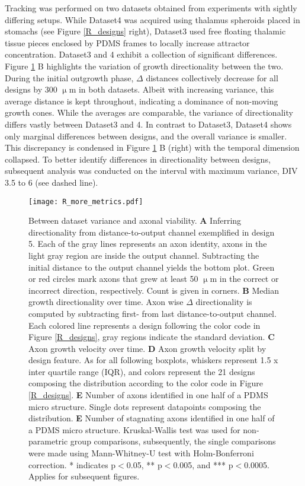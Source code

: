 Tracking was performed on two datasets obtained from experiments with sightly
differing setups. While Dataset4 was acquired using thalamus spheroids placed in
stomachs (see Figure \ref{R_designs} right), Dataset3 used free floating
thalamic tissue pieces enclosed by PDMS frames to locally increase attractor
concentration. Dataset3 and 4 exhibit a collection of significant differences.
Figure \ref{R_more_metrics} B highlights the variation of growth directionality
between the two. During the initial outgrowth phase, $\Delta$ distances
collectively decrease for all designs by 300 $\upmu$m in both datasets. Albeit
with increasing variance, this average distance is kept throughout, indicating a
dominance of non-moving growth cones. While the averages are comparable, the
variance of directionality differs vastly between Dataset3 and 4. In contrast to
Dataset3, Dataset4 shows only marginal differences between designs, and the
overall variance is smaller. This discrepancy is condensed in Figure
\ref{R_more_metrics} B (right) with the temporal dimension collapsed. To better
identify differences in directionality between designs, subsequent analysis was
conducted on the interval with maximum variance, DIV 3.5 to 6 (see dashed line).

\begin{figure}[h!]
    \texttt{[image: R\_more\_metrics.pdf]}
    \caption[Between dataset variance and axonal viability]
        {Between dataset variance and axonal viability. \textbf{A} Inferring
        directionality from distance-to-output channel exemplified in design 5.
        Each of the gray lines represents an axon identity, axons in the light
        gray region are inside the output channel. Subtracting the initial
        distance to the output channel yields the bottom plot. Green or red
        circles mark axons that grew at least 50 $\upmu$m in the correct or
        incorrect direction, respectively. Count is given in corners. \textbf{B}
        Median growth directionality over time. Axon wise $\Delta$
        directionality is computed by subtracting first- from last
        distance-to-output channel. Each colored line represents a design
        following the color code in Figure \ref{R_designs}, gray regions
        indicate the standard deviation. \textbf{C} Axon growth velocity over
        time. \textbf{D} Axon growth velocity split by design feature. As for
        all following boxplots, whiskers represent 1.5 x inter quartile range
        (IQR), and colors represent the 21 designs composing the distribution
        according to the color code in Figure \ref{R_designs}. \textbf{E} Number
        of axons identified in one half of a PDMS micro structure. Single dots
        represent datapoints composing the distribution. \textbf{E} Number of
        stagnating axons identified in one half of a PDMS micro structure.
        Kruskal-Wallis test was used for non-parametric group comparisons,
        subsequently, the single comparisons were made using Mann-Whitney-U test
        with Holm-Bonferroni correction. * indicates p$<$0.05, ** p$<$0.005, and
        *** p$<$0.0005. Applies for subsequent figures.} 
    \label{R_more_metrics}
\end{figure}



